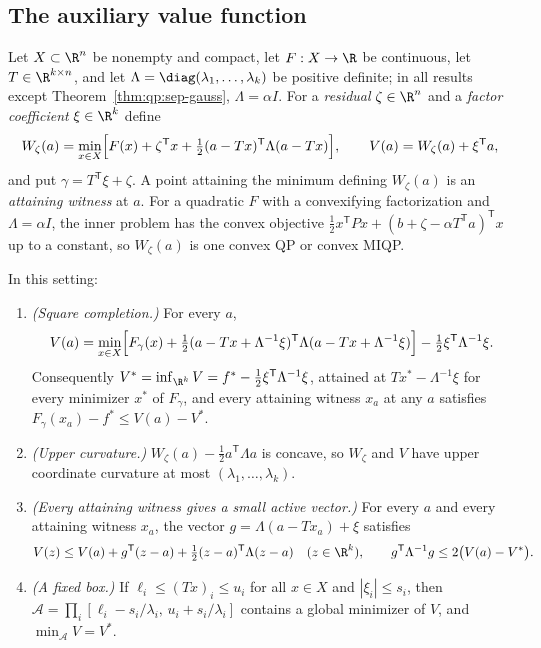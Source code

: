 \subsection{The auxiliary value function}\label{sec:qp:aux}

Let $X\subset\R^n$ be nonempty and compact, let $F:X\to\R$ be continuous,
let $T\in\R^{k\times n}$, and let $\Lambda=\diag(\lambda_1,\dots,\lambda_k)$
be positive definite; in all results except Theorem~\ref{thm:qp:sep-gauss},
$\Lambda=\alpha I$. For a \emph{residual} $\zeta\in\R^n$ and a \emph{factor
coefficient} $\xi\in\R^k$ define
\[
 W_\zeta(a)=\min_{x\in X}\Bigl[F(x)+\zeta^{\mathsf T} x+\tfrac12(a-Tx)^{\mathsf T}\Lambda(a-Tx)\Bigr],
 \qquad
 V(a)=W_\zeta(a)+\xi^{\mathsf T} a,
\]
and put $\gamma=T^{\mathsf T}\xi+\zeta$. A point attaining the minimum defining
$W_\zeta(a)$ is an \emph{attaining witness} at $a$. For a quadratic $F$ with a
convexifying factorization and $\Lambda=\alpha I$, the inner problem has the
convex objective $\frac12x^{\mathsf T} Px+(b+\zeta-\alpha T^{\mathsf T} a)^{\mathsf T} x$ up to a
constant, so $W_\zeta(a)$ is one convex QP or convex MIQP.

\begin{lemma}\label{lem:qp:aux}
In this setting:
\begin{enumerate}[label=(\alph*)]
\item \emph{(Square completion.)} For every $a$,
 \[
  V(a)=\min_{x\in X}\Bigl[F_\gamma(x)+\tfrac12(a-Tx+\Lambda^{-1}\xi)^{\mathsf T}\Lambda(a-Tx+\Lambda^{-1}\xi)\Bigr]
  -\tfrac12\xi^{\mathsf T}\Lambda^{-1}\xi .
 \]
 Consequently $V^*=\inf_{\R^k}V=f^*-\frac12\xi^{\mathsf T}\Lambda^{-1}\xi$, attained at
 $Tx^*-\Lambda^{-1}\xi$ for every minimizer $x^*$ of $F_\gamma$, and every
 attaining witness $x_a$ at any $a$ satisfies $F_\gamma(x_a)-f^*\le V(a)-V^*$.
\item \emph{(Upper curvature.)} $W_\zeta(a)-\frac12a^{\mathsf T}\Lambda a$ is concave,
 so $W_\zeta$ and $V$ have upper coordinate curvature at most
 $(\lambda_1,\dots,\lambda_k)$.
\item \emph{(Every attaining witness gives a small active vector.)} For
 every $a$ and every attaining witness $x_a$, the vector
 $g=\Lambda(a-Tx_a)+\xi$ satisfies
 \[
  V(z)\le V(a)+g^{\mathsf T}(z-a)+\tfrac12(z-a)^{\mathsf T}\Lambda(z-a)\quad(z\in\R^k),
  \qquad
  g^{\mathsf T}\Lambda^{-1}g\le2\bigl(V(a)-V^*\bigr).
 \]
\item \emph{(A fixed box.)} If $\ell_i\le(Tx)_i\le u_i$ for all $x\in X$ and
 $|\xi_i|\le s_i$, then
 $\mathcal A=\prod_i[\ell_i-s_i/\lambda_i,\,u_i+s_i/\lambda_i]$ contains a
 global minimizer of $V$, and $\min_{\mathcal A}V=V^*$.
\end{enumerate}
\end{lemma}

